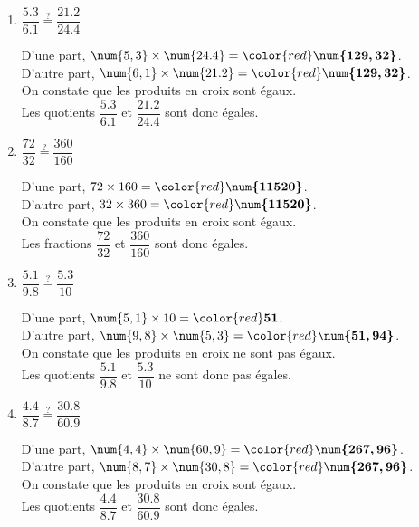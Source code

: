 \begin{corrige}
    \begin{enumerate}
        \item $\dfrac{\num{5,3}}{\num{6,1}}\overset{?}{=}\dfrac{\num{21.2}}{\num{24.4}}$\par
        D'une part, $\num{5,3}\times \num{24.4} = {\color{red}\boldsymbol{\num{129,32}}}$.\\
                    D'autre part, $\num{6,1}\times \num{21.2} = {\color{red}\boldsymbol{\num{129,32}}}$.\\
                    On constate que les produits en croix sont égaux.\\
                    Les quotients $\dfrac{\num{5,3}}{\num{6,1}}$ et $\dfrac{\num{21.2}}{\num{24.4}}$ sont donc égales.
        \item $\dfrac{72}{32}\overset{?}{=}\dfrac{360}{160}$\par
        D'une part, $72\times 160 = {\color{red}\boldsymbol{\num{11 520}}}$.\\
                    D'autre part, $32\times 360 = {\color{red}\boldsymbol{\num{11 520}}}$.\\
                    On constate que les produits en croix sont égaux.\\
                    Les fractions $\dfrac{72}{32}$ et $\dfrac{360}{160}$ sont donc égales.
    \end{enumerate}
    \Coupe
    \begin{enumerate}
        \setcounter{enumi}{2}
        \item $\dfrac{\num{5,1}}{\num{9,8}}\overset{?}{=}\dfrac{\num{5,3}}{10}$\par
        D'une part, $\num{5,1}\times 10 = {\color{red}\boldsymbol{51}}$.\\
                    D'autre part, $\num{9,8}\times \num{5,3} = {\color{red}\boldsymbol{\num{51,94}}}$.\\
                    On constate que les produits en croix ne sont pas égaux.\\
                    Les quotients $\dfrac{\num{5,1}}{\num{9,8}}$ et $\dfrac{\num{5,3}}{10}$ ne sont donc pas égales.
        \item $\dfrac{\num{4,4}}{\num{8,7}}\overset{?}{=}\dfrac{\num{30,8}}{\num{60,9}}$\par
        D'une part, $\num{4,4}\times \num{60,9} = {\color{red}\boldsymbol{\num{267,96}}}$.\\
                    D'autre part, $\num{8,7}\times \num{30,8} = {\color{red}\boldsymbol{\num{267,96}}}$.\\
                    On constate que les produits en croix sont égaux.\\
                    Les quotients $\dfrac{\num{4,4}}{\num{8,7}}$ et $\dfrac{\num{30,8}}{\num{60,9}}$ sont donc égales.
        \end{enumerate}
\end{corrige}

